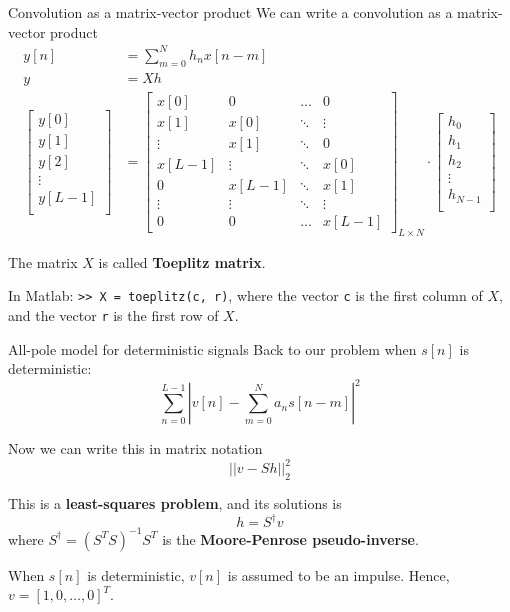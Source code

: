 \begin{frame}{Convolution as a matrix-vector product}
We can write a convolution as a matrix-vector product
\begin{align*}
y[n] &= \sum_{m = 0}^N h_nx[n-m] \\
y &= Xh \\
\begin{bmatrix}
y[0] \\
y[1] \\
y[2] \\
\vdots \\ 
y[L-1] \\
\end{bmatrix}
&= \begin{bmatrix}
x[0] & 0 & \ldots & 0 \\
x[1] & x[0] & \ddots & \vdots \\
\vdots & x[1] & \ddots &  0\\
x[L-1] & \vdots &\ddots &  x[0]\\
0 & x[L-1] & \ddots & x[1] \\
\vdots & \vdots & \ddots &  \vdots \\
0  & 0 & \ldots & x[L-1] 
\end{bmatrix}_{L\times N}\cdot\begin{bmatrix}
h_0 \\
h_1 \\
h_2 \\
\vdots \\ 
h_{N-1} \\
\end{bmatrix}
\end{align*}

The matrix $X$ is called \textbf{Toeplitz matrix}.

\vspace{0.25cm}
In Matlab: \texttt{>> X = toeplitz(c, r)}, where the vector \texttt{c} is the first column of $X$, and the vector \texttt{r} is the first row of $X$.

\end{frame}


\begin{frame}{All-pole model for deterministic signals}
Back to our problem when $s[n]$ is deterministic:
\begin{equation}
\sum_{n = 0}^{L-1} |v[n] - \sum_{m = 0}^N a_ns[n-m]|^2 \tag{if $s[n]$ is deterministic}
\end{equation}

Now we can write this in matrix notation
\begin{equation*}
||v - Sh||^2_2
\end{equation*}

This is a \textbf{least-squares problem}, and its solutions is 
\begin{equation}
h = S^{\dagger}v \tag{least-squares solution}
\end{equation}
where $S^{\dagger} = (S^TS)^{-1}S^T$ is the \textbf{Moore-Penrose pseudo-inverse}.

\vspace{0.25cm}
When $s[n]$ is deterministic, $v[n]$ is assumed to be an impulse. Hence, $v = [1, 0, \ldots, 0]^T$.
\end{frame}



